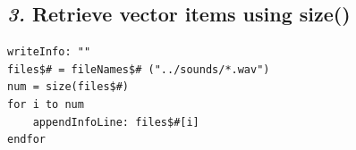 \documentclass[12pt, english]{article}
\begin{document}
\subsection*{\emph{3.} Retrieve vector items using size()}

\begin{lstlisting}
writeInfo: ""
files$# = fileNames$# ("../sounds/*.wav")
num = size(files$#)
for i to num
	appendInfoLine: files$#[i]
endfor
\end{lstlisting}


\end{document}
